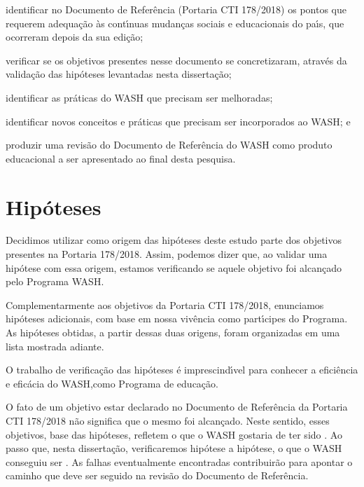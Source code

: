 \documentclass[
12pt,		%
openright,	%
twoside,  %
a4paper,			%
chapter=TITLE,		%
english,			%
french,				%
spanish,			%
brazil				%
]{USPSC-classe/USPSC}
\begin{document}
\begin{alineas}
\item identificar no Documento de Refer\^encia (Portaria CTI 178/2018) os pontos que requerem adequa\c{c}\~ao \`as cont\'{\i}nuas mudan\c{c}as sociais e educacionais do pa\'{\i}s, que ocorreram depois da sua edi\c{c}\~ao;
\item verificar se os objetivos presentes nesse documento se concretizaram, atrav\'es da valida\c{c}\~ao das hip\'oteses levantadas nesta disserta\c{c}\~ao;
\item identificar as pr\'aticas do WASH que precisam ser melhoradas;
\item identificar novos conceitos e pr\'aticas que precisam ser incorporados ao WASH; e
\item produzir uma revis\~ao do Documento de Refer\^encia do WASH como produto educacional a ser apresentado ao final desta pesquisa.
\end{alineas}

\section[Hip\'oteses]{Hip\'oteses}\label{Hip\'oteses}
Decidimos utilizar como origem das hip\'oteses deste estudo parte dos objetivos presentes na Portaria 178/2018. Assim, podemos dizer que, ao validar uma hip\'otese com essa origem, estamos verificando se aquele objetivo foi alcan\c{c}ado pelo Programa WASH.









Complementarmente aos objetivos da Portaria CTI 178/2018, enunciamos hip\'oteses adicionais, com base em nossa viv\^encia como part\'{\i}cipes do Programa. As hip\'oteses obtidas, a partir dessas duas origens, foram organizadas em uma lista mostrada adiante.









O trabalho de verifica\c{c}\~ao das hip\'oteses \'e imprescind\'{\i}vel para conhecer a efici\^encia e efic\'acia do WASH,como Programa de educa\c{c}\~ao.









O fato de um objetivo estar declarado no Documento de Refer\^encia da Portaria CTI 178/2018 n\~ao significa que o mesmo foi alcan\c{c}ado. Neste sentido, esses objetivos, base das hip\'oteses, refletem \textquotedbl  o que o WASH gostaria de ter sido \textquotedbl . Ao passo que, nesta disserta\c{c}\~ao, verificaremos hip\'otese a hip\'otese, \textquotedbl  o que o WASH conseguiu ser \textquotedbl . As falhas eventualmente encontradas contribuir\~ao para apontar o caminho que deve ser seguido na revis\~ao do Documento de Refer\^encia.
\end{document}
